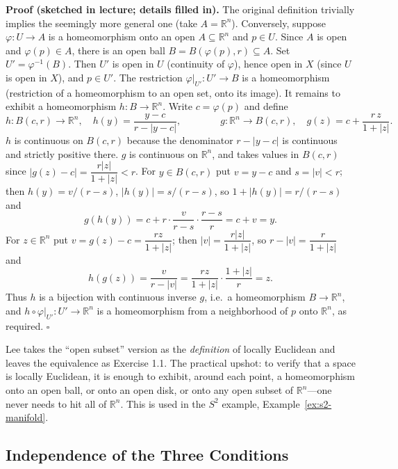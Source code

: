 \documentclass[11pt]{report}
\renewenvironment{proof}[1][Proof]{\noindent\textbf{#1.} }{\hfill$\square$\par\vspace{5pt}}
\begin{document}
\begin{proof}[Proof (sketched in lecture; details filled in)]
The original definition trivially implies the seemingly more general one (take $A = \mathbb{R}^n$). Conversely, suppose $\varphi : U \to A$ is a homeomorphism onto an open $A \subseteq \mathbb{R}^n$ and $p \in U$. Since $A$ is open and $\varphi(p) \in A$, there is an open ball $B = B(\varphi(p), r) \subseteq A$. Set $U' = \varphi^{-1}(B)$. Then $U'$ is open in $U$ (continuity of $\varphi$), hence open in $X$ (since $U$ is open in $X$), and $p \in U'$. The restriction $\varphi|_{U'} : U' \to B$ is a homeomorphism (restriction of a homeomorphism to an open set, onto its image). It remains to exhibit a homeomorphism $h : B \to \mathbb{R}^n$. Write $c = \varphi(p)$ and define
\[
h : B(c,r) \to \mathbb{R}^n, \quad h(y) = \frac{y - c}{r - |y - c|}, \qquad\qquad g : \mathbb{R}^n \to B(c,r), \quad g(z) = c + \frac{r\, z}{1 + |z|}.
\]
$h$ is continuous on $B(c,r)$ because the denominator $r - |y-c|$ is continuous and strictly positive there. $g$ is continuous on $\mathbb{R}^n$, and takes values in $B(c,r)$ since $|g(z) - c| = \dfrac{r|z|}{1+|z|} < r$. For $y \in B(c,r)$ put $v = y - c$ and $s = |v| < r$; then $h(y) = v/(r-s)$, $|h(y)| = s/(r-s)$, so $1 + |h(y)| = r/(r-s)$ and
\[
g(h(y)) = c + r \cdot \frac{v}{r-s} \cdot \frac{r-s}{r} = c + v = y.
\]
For $z \in \mathbb{R}^n$ put $v = g(z) - c = \dfrac{rz}{1+|z|}$; then $|v| = \dfrac{r|z|}{1+|z|}$, so $r - |v| = \dfrac{r}{1+|z|}$ and
\[
h(g(z)) = \frac{v}{r - |v|} = \frac{rz}{1+|z|} \cdot \frac{1+|z|}{r} = z.
\]
Thus $h$ is a bijection with continuous inverse $g$, i.e.\ a homeomorphism $B \to \mathbb{R}^n$, and $h \circ \varphi|_{U'} : U' \to \mathbb{R}^n$ is a homeomorphism from a neighborhood of $p$ onto $\mathbb{R}^n$, as required.
\end{proof}

\begin{rembox}\label{rem:manifolds}
Lee takes the ``open subset'' version as the \emph{definition} of locally Euclidean and leaves the equivalence as Exercise 1.1. The practical upshot: to verify that a space is locally Euclidean, it is enough to exhibit, around each point, a homeomorphism onto an open ball, or onto an open disk, or onto any open subset of $\mathbb{R}^n$---one never needs to hit all of $\mathbb{R}^n$. This is used in the $S^2$ example, Example~\ref{ex:s2-manifold}.
\end{rembox}

\subsection{Independence of the Three Conditions}
\end{document}
